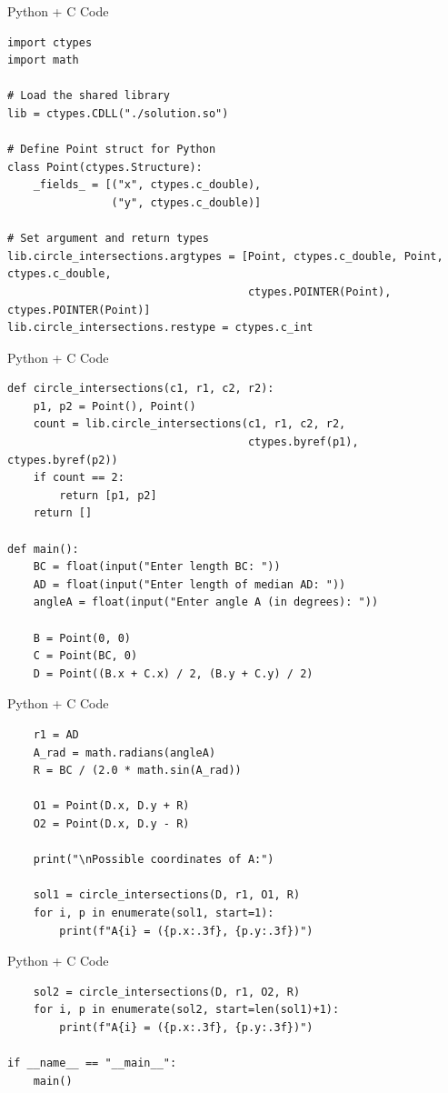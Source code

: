 \documentclass{beamer}
\begin{document}
\begin{frame}[fragile]{Python + C Code}
    \begin{verbatim}
import ctypes
import math

# Load the shared library
lib = ctypes.CDLL("./solution.so")

# Define Point struct for Python
class Point(ctypes.Structure):
    _fields_ = [("x", ctypes.c_double),
                ("y", ctypes.c_double)]

# Set argument and return types
lib.circle_intersections.argtypes = [Point, ctypes.c_double, Point, ctypes.c_double,
                                     ctypes.POINTER(Point), ctypes.POINTER(Point)]
lib.circle_intersections.restype = ctypes.c_int
    \end{verbatim}
\end{frame}

\begin{frame}[fragile]{Python + C Code}
    \begin{verbatim}
def circle_intersections(c1, r1, c2, r2):
    p1, p2 = Point(), Point()
    count = lib.circle_intersections(c1, r1, c2, r2,
                                     ctypes.byref(p1), ctypes.byref(p2))
    if count == 2:
        return [p1, p2]
    return []

def main():
    BC = float(input("Enter length BC: "))
    AD = float(input("Enter length of median AD: "))
    angleA = float(input("Enter angle A (in degrees): "))

    B = Point(0, 0)
    C = Point(BC, 0)
    D = Point((B.x + C.x) / 2, (B.y + C.y) / 2)
    \end{verbatim}
\end{frame}

\begin{frame}[fragile]{Python + C Code}
    \begin{verbatim}
    r1 = AD
    A_rad = math.radians(angleA)
    R = BC / (2.0 * math.sin(A_rad))

    O1 = Point(D.x, D.y + R)
    O2 = Point(D.x, D.y - R)

    print("\nPossible coordinates of A:")

    sol1 = circle_intersections(D, r1, O1, R)
    for i, p in enumerate(sol1, start=1):
        print(f"A{i} = ({p.x:.3f}, {p.y:.3f})")
    \end{verbatim}
\end{frame}

\begin{frame}[fragile]{Python + C Code}
    \begin{verbatim}
    sol2 = circle_intersections(D, r1, O2, R)
    for i, p in enumerate(sol2, start=len(sol1)+1):
        print(f"A{i} = ({p.x:.3f}, {p.y:.3f})")

if __name__ == "__main__":
    main()
    \end{verbatim}
\end{frame}
\end{document}
